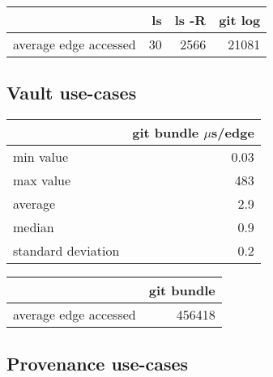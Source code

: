 \documentclass[11pt,a4paper]{article}
\begin{document}
\vspace{0.5cm}

\begin{center}
    \begin{tabular}{@{} l *3r @{}}
        \toprule
        \multicolumn{1}{c}{} &
            \textbf{ls} &
            \textbf{ls -R} &
            \textbf{git log} \\
        \midrule
        average edge accessed & 30 & 2566 & 21081 \\
        \bottomrule
    \end{tabular}
\end{center}

\newpage

\subsection{Vault use-cases}

\begin{center}
    \begin{tabular}{@{} l r @{}}
        \toprule
        \multicolumn{1}{c}{} &
            \thead{\normalsize{\textbf{git bundle}} \\ $\mu$s/edge} \\
        \midrule
        min value & 0.03 \\
        max value & 483 \\
        average & 2.9 \\
        median & 0.9 \\
        standard deviation & 0.2 \\
        \bottomrule
    \end{tabular}
\end{center}

\vspace{0.5cm}

\begin{center}
    \begin{tabular}{@{} l r @{}}
        \toprule
        \multicolumn{1}{c}{} &
            \textbf{git bundle} \\
        \midrule
        average edge accessed & 456418 \\
        \bottomrule
    \end{tabular}
\end{center}

\subsection{Provenance use-cases}
\end{document}
